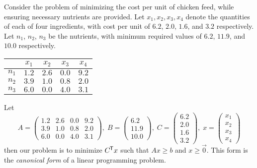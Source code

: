 \begin{exmp}
    Consider the problem of minimizing the cost per unit of chicken feed, while ensuring necessary nutrients are provided. Let $x_1, x_2, x_3, x_4$ denote the quantities of each of four ingredients, with cost per unit of $6.2$, $2.0$, $1.6$, and $3.2$ respectively. Let $n_1$, $n_2$, $n_3$ be the nutrients, with minimum required values of $6.2$, $11.9$, and $10.0$ respectively.

    \begin{minipage}{\linewidth}
        \begin{center}
        \label{exmp-feed-nutrition-values}
        \begin{tabular}{c|cccc}
        & $x_1$ & $x_2$ & $x_3$ & $x_4$\\
        \hline
        $n_1$ & $1.2$ & $2.6$ & $0.0$ & $9.2$ \\ \hline
        $n_2$ & $3.9$ & $1.0$ & $0.8$ & $2.0$ \\ \hline
        $n_3$ & $6.0$ & $0.0$ & $4.0$ & $3.1$ \\
        \end{tabular}
        \end{center}
    \end{minipage}

    Let
    \[A = \begin{pmatrix}
        1.2 & 2.6 & 0.0 & 9.2 \\
        3.9 & 1.0 & 0.8 & 2.0 \\
        6.0 & 0.0 & 4.0 & 3.1
    \end{pmatrix},\; B = \begin{pmatrix}
        6.2 \\ 11.9 \\ 10.0
    \end{pmatrix},\; C = \begin{pmatrix}
        6.2 \\ 2.0 \\ 1.6 \\ 3.2
    \end{pmatrix},\; x = \begin{pmatrix}
        x_1 \\ x_2 \\ x_3 \\ x_4
    \end{pmatrix}\]
    then our problem is to minimize $C^{\mkern-1.5mu\mathsf{T}}x$ such that $Ax \geq b$ and $x \geq \vec{0}$. This form is the \emph{canonical form} of a linear programming problem.
\end{exmp}

